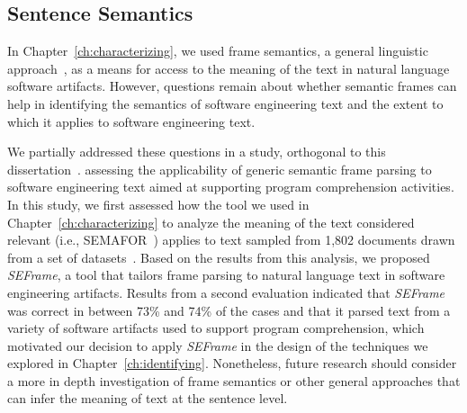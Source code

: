 








\subsection{Sentence Semantics}
\label{cp7:semantics}




In Chapter~\ref{ch:characterizing}, we used frame semantics, a general linguistic approach~\cite{fillmore1976frame},
as a means for access to the meaning of the text in natural language software artifacts.
However, questions remain about whether
semantic frames can help in identifying the semantics of software engineering text
and the extent to which it applies to software engineering text.




We partially addressed these questions in a study, 
orthogonal to this dissertation~\cite{marques2021}. 
assessing the applicability of generic semantic frame
parsing to software engineering text
aimed at supporting program
comprehension activities.
In this study, we first assessed how the tool we used in Chapter~\ref{ch:characterizing}
to analyze the meaning of the text considered relevant (i.e., SEMAFOR~\cite{das2014frame})
 applies to text sampled from 1,802 documents drawn from a set of datasets~\cite{Arya2019, Xu2017, Maalej2013, Chaparro2017}. 
Based on the results from this analysis, 
we proposed \textit{SEFrame}, a tool that tailors 
frame parsing to natural language text in software engineering artifacts.
Results from a second evaluation indicated that \textit{SEFrame} was 
 correct in between 73\% and 74\% of
the cases and that it parsed text from a variety of software artifacts used to support program
comprehension, which motivated our decision to apply \textit{SEFrame} 
in the design of the techniques we explored in Chapter~\ref{ch:identifying}.
Nonetheless,  
future research should consider
a more in depth investigation of 
frame semantics or other general approaches that can infer the meaning of text at the sentence level. 


